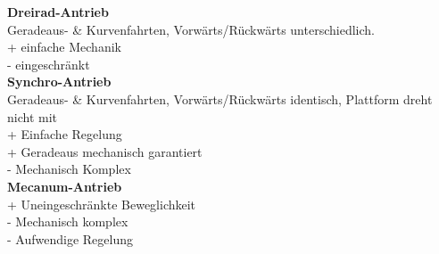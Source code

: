 \textbf{Dreirad-Antrieb}\\
Geradeaus- \& Kurvenfahrten, Vorwärts/Rückwärts unterschiedlich.\\
+ einfache Mechanik\\
- eingeschränkt\\

\textbf{Synchro-Antrieb}\\
Geradeaus- \& Kurvenfahrten, Vorwärts/Rückwärts identisch, Plattform dreht nicht mit\\
+ Einfache Regelung\\
+ Geradeaus mechanisch garantiert\\
- Mechanisch Komplex\\

\textbf{Mecanum-Antrieb}\\
+ Uneingeschränkte Beweglichkeit\\
- Mechanisch komplex\\ 
- Aufwendige Regelung\\